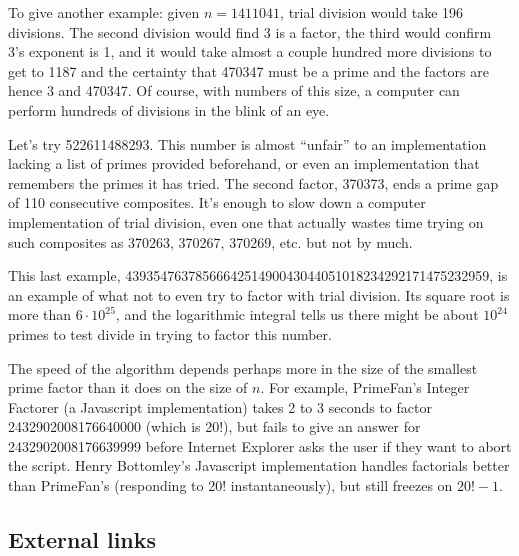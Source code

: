 \documentclass[12pt]{article}
\begin{document}
To give another example: given $n = 1411041$, trial division would take 196 divisions. The second division would find 3 is a factor, the third would confirm 3's exponent is 1, and it would take almost a couple hundred more divisions to get to 1187 and the certainty that 470347 must be a prime and the factors are hence 3 and 470347. Of course, with numbers of this size, a computer can perform hundreds of divisions in the blink of an eye.

Let's try 522611488293. This number is almost ``unfair'' to an implementation lacking a list of primes provided beforehand, or even an implementation that remembers the primes it has tried. The second factor, 370373, ends a prime gap of 110 consecutive composites. It's enough to slow down a computer implementation of trial division, even one that actually wastes time trying on such composites as 370263, 370267, 370269, etc. but not by much.

This last example, 4393547637856664251490043044051018234292171475232959, is an example of what not to even try to factor with trial division. Its square root is more than $6 \cdot 10^{25}$, and the logarithmic integral tells us there might be about $10^{24}$ primes to test divide in trying to factor this number.

The speed of the algorithm depends perhaps more in the size of the smallest prime factor than it does on the size of $n$. For example, PrimeFan's Integer Factorer (a Javascript implementation) takes 2 to 3 seconds to factor 2432902008176640000 (which is 20!), but fails to give an answer for 2432902008176639999 before Internet Explorer asks the user if they want to abort the script. Henry Bottomley's Javascript implementation handles factorials better than PrimeFan's (responding to 20! instantaneously), but still freezes on $20! - 1$.

\subsection{External links}

\end{document}
